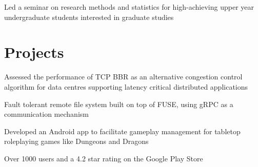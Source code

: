 \documentclass[]{chowes-resume}
\begin{document}
\begin{minipage}[t]{0.66\textwidth}
\begin{tightemize}
\item Led a seminar on research methods and statistics for high-achieving upper year undergraduate students interested in graduate studies
\end{tightemize}
\sectionsep


\section{Projects}

\begin{tightemize}
\item Assessed the performance of TCP BBR as an alternative congestion control algorithm for data centres supporting latency critical distributed applications 
\end{tightemize}
\sectionsep

\begin{tightemize}
\item Fault tolerant remote file system built on top of FUSE, using gRPC as a communication mechanism
\end{tightemize}
\sectionsep

\begin{tightemize}
\item Developed an Android app to facilitate gameplay management for tabletop roleplaying games like Dungeons and Dragons
\item Over 1000 users and a 4.2 star rating on the Google Play Store
\end{tightemize}
\sectionsep

\end{minipage} 
\end{document}
